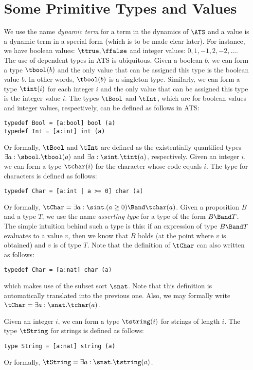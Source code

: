 \section{Some Primitive Types and Values}
We use the name {\em dynamic term} for a term in the dynamics of $\ATS$ and
a value is a dynamic term in a special form (which is to be made clear
later). For instance, we have boolean values: $\ttrue,\ffalse$ and integer
values: $0,1,-1,2,-2,\ldots$.  The use of dependent types in ATS is
ubiquitous.  Given a boolean $b$, we can form a type $\tbool(b)$ and the
only value that can be assigned this type is the boolean value $b$.  In
other words, $\tbool(b)$ is a singleton type.  Similarly, we can form a
type $\tint(i)$ for each integer $i$ and the only value that can be
assigned this type is the integer value $i$.  The types $\tBool$ and
$\tInt$, which are for boolean values and integer values, respectively, can
be defined as follows in ATS:
\begin{verbatim}
typedef Bool = [a:bool] bool (a)
typedef Int = [a:int] int (a)
\end{verbatim}
Or formally, $\tBool$ and $\tInt$ are defined as the existentially
quantified types $\exists a:\sbool.\tbool (a)$ and $\exists a:\sint.\tint
(a)$, respectively.  Given an integer $i$, we can form a type $\tchar(i)$
for the character whose code equals $i$. The type for characters is defined
as follows:
\begin{verbatim}
typedef Char = [a:int | a >= 0] char (a)
\end{verbatim}
Or formally, $\tChar=\exists a:\sint.(a\geq 0)\Band\tchar (a)$.  Given a
proposition $B$ and a type $T$, we use the name {\em asserting type} for a
type of the form $B\Band T$. The simple intuition behind such a type is
this: if an expression of type $B\Band T$ evaluates to a value $v$, then we
know that $B$ holds (at the point where $v$ is obtained) and $v$ is of type
$T$.  Note that the definition of $\tChar$ can also written as follows:
\begin{verbatim}
typedef Char = [a:nat] char (a)
\end{verbatim}
which makes use of the subset sort $\snat$. Note that this definition is
automatically translated into the previous one.  Also, we may formally
write $\tChar=\exists a:\snat.\tchar (a)$.

Given an integer $i$, we can form a type $\tstring(i)$ for strings of
length $i$. The type $\tString$ for strings is defined as follows:
\begin{verbatim}
type String = [a:nat] string (a)
\end{verbatim}
Or formally, $\tString=\exists a:\snat.\tstring (a)$.

